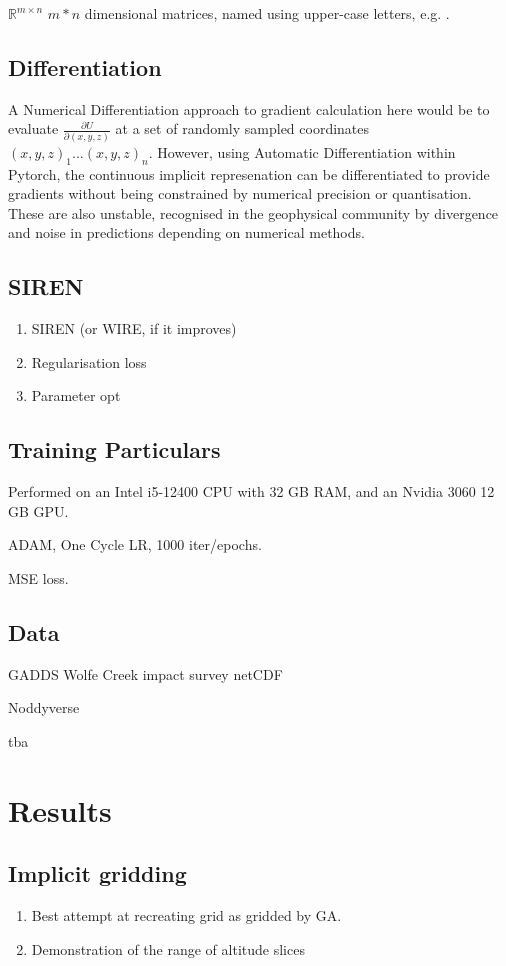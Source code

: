 \documentclass{article}
\begin{document}
$\mathbb{R}^{m\times{}n}$ $m*n$ dimensional matrices, named using upper-case letters, e.g. .

\subsection{Differentiation}
A Numerical Differentiation approach to gradient calculation here would be to evaluate $\frac{\partial{U}}{\partial{(x, y, z)}}$ at a set of randomly sampled coordinates $(x, y, z)_1 ... (x,y,z)_n$.
However, using Automatic Differentiation within Pytorch, the continuous implicit represenation can be differentiated to provide gradients without being constrained by numerical precision or quantisation.
These are also unstable, recognised in the geophysical community by divergence and noise in predictions depending on numerical methods.



\subsection{SIREN}
\begin{enumerate}
    \item SIREN (or WIRE, if it improves)
    \item Regularisation loss
    \item Parameter opt
\end{enumerate}

\subsection{Training Particulars}
Performed on an Intel i5-12400 CPU with 32 GB RAM, and an Nvidia 3060 12 GB GPU.

ADAM, One Cycle LR, 1000 iter/epochs.

MSE loss.

\subsection{Data}
GADDS Wolfe Creek impact survey netCDF

Noddyverse

tba

\section{Results}
\subsection{Implicit gridding}
\begin{enumerate}
    \item Best attempt at recreating grid as gridded by GA.
    \item Demonstration of the range of altitude slices
\end{enumerate}
\end{document}
